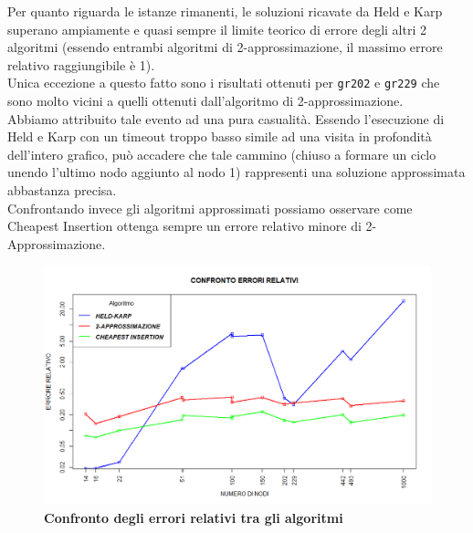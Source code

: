 \documentclass[]{article}
\begin{document}
\begin{flushleft}
Per quanto riguarda le istanze rimanenti, le soluzioni ricavate da Held e Karp superano ampiamente e quasi sempre il limite teorico di errore degli altri 2 algoritmi (essendo entrambi algoritmi di 2-approssimazione, il massimo errore relativo raggiungibile è 1).\\
Unica eccezione a questo fatto sono i risultati ottenuti per \verb|gr202| e \verb|gr229| che sono molto vicini a quelli ottenuti dall'algoritmo di 2-approssimazione.\\
Abbiamo attribuito tale evento ad una pura casualità. Essendo l'esecuzione di Held e Karp con un timeout troppo basso simile ad una visita in profondità dell'intero grafico, può accadere che tale cammino (chiuso a formare un ciclo unendo l'ultimo nodo aggiunto al nodo 1) rappresenti una soluzione approssimata abbastanza precisa.\\
\medskip
Confrontando invece gli algoritmi approssimati possiamo osservare come Cheapest Insertion ottenga sempre un errore relativo minore di 2-Approssimazione.
\begin{figure}[h]
	\centering
	\includegraphics[width=\textwidth,height=\textheight,keepaspectratio]{CONFRONTO_ERRORI_RELATIVI_20_MIN_NEW.png}
	\caption{\textbf{Confronto degli errori relativi tra gli algoritmi}}
	\label{conf_tot}
\end{figure}
\newpage

\end{flushleft}
\end{document}
